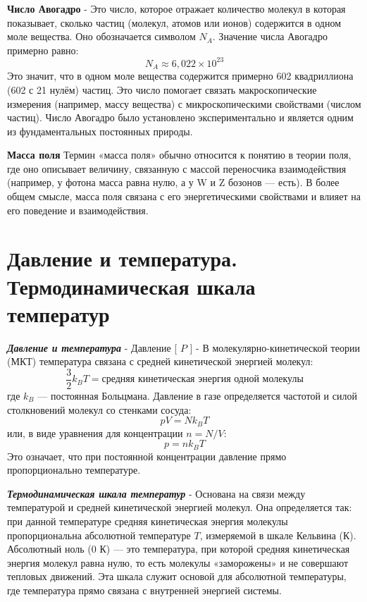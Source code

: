 \documentclass[14pt]{article}
\begin{document}
    \textbf{Число Авогадро}
    - Это число, которое отражает количество молекул в которая показывает, сколько частиц (молекул, атомов или ионов) содержится в одном моле вещества. 
    Оно обозначается символом \( N_A \). 
    Значение числа Авогадро примерно равно: \[ N_A \approx 6,022 \times 10^{23} \] Это значит, что в одном моле вещества содержится примерно 602 квадриллиона (602 с 21 нулём) частиц. Это число помогает связать макроскопические измерения (например, массу вещества) с микроскопическими свойствами (числом частиц). Число Авогадро было установлено экспериментально и является одним из фундаментальных постоянных природы.
     
    \textbf{Масса поля}
    Термин «масса поля» обычно относится к понятию в теории поля, где оно описывает величину, связанную с массой переносчика взаимодействия (например, у фотона масса равна нулю, а у W и Z бозонов — есть). В более общем смысле, масса поля связана с его энергетическими свойствами и влияет на его поведение и взаимодействия.

    
    \section{Давление и температура. Термодинамическая шкала температур}
    \textbf{\textit{Давление и температура}}
    - Давление [ $P$ ] - В молекулярно-кинетической теории (МКТ) температура связана с средней кинетической энергией молекул: \[ \frac{3}{2} k_B T = \text{средняя кинетическая энергия одной молекулы} \] где \(k_B\) — постоянная Больцмана. Давление в газе определяется частотой и силой столкновений молекул со стенками сосуда: \[ pV = N k_B T \] или, в виде уравнения для концентрации \(n = N/V\): \[ p = n k_B T \] Это означает, что при постоянной концентрации давление прямо пропорционально температуре.
    
    \textbf{\textit{Термодинамическая шкала температур}}
    - Основана на связи между температурой и средней кинетической энергией молекул. Она определяется так: при данной температуре средняя кинетическая энергия молекулы пропорциональна абсолютной температуре \( T \), измеряемой в шкале Кельвина (К). Абсолютный ноль (0 К) — это температура, при которой средняя кинетическая энергия молекул равна нулю, то есть молекулы «заморожены» и не совершают тепловых движений. Эта шкала служит основой для абсолютной температуры, где температура прямо связана с внутренней энергией системы.
\end{document}
